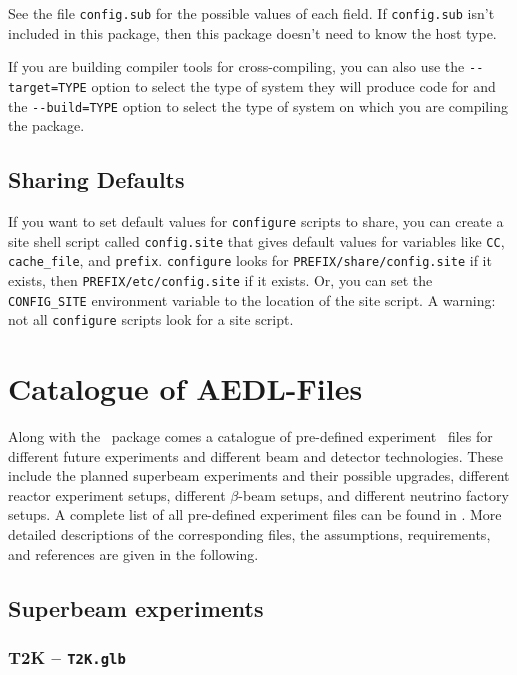 See the file \verb+config.sub+ for the possible values of each field.  If
\verb+config.sub+ isn't included in this package, then this package doesn't
need to know the host type.

   If you are building compiler tools for cross-compiling, you can also
use the \verb+--target=TYPE+ option to select the type of system they will
produce code for and the \verb+--build=TYPE+ option to select the type of
system on which you are compiling the package.

\section*{Sharing Defaults}

   If you want to set default values for \verb+configure+ scripts to share,
you can create a site shell script called \verb+config.site+ that gives
default values for variables like \verb+CC+, \verb+cache_file+, and \verb+prefix+.
\verb+configure+ looks for \verb+PREFIX/share/config.site+ if it exists, then
\verb+PREFIX/etc/config.site+ if it exists.  Or, you can set the
\verb+CONFIG_SITE+ environment variable to the location of the site script.
A warning: not all \verb+configure+ scripts look for a site script.




\chapter{Catalogue of {\sf AEDL}-Files}
\label{app:aedlfiles}
Along with the \GLOBES\ package comes a catalogue of pre-defined experiment \AEDL\ files for different
future experiments and different beam and detector technologies. These include the planned superbeam experiments
and their possible upgrades, different reactor experiment setups, different $\beta$-beam setups, and different 
neutrino factory setups. A complete list
of all pre-defined experiment files can be found in . More detailed descriptions of the
corresponding files, the assumptions, requirements, and references are given in the following. 
   
\section*{Superbeam experiments}
\subsection*{T2K -- {\tt T2K.glb}}

